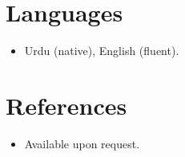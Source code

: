 \documentclass[11pt,a4paper,sans]{moderncv}
\begin{document}

\section{Languages}
\vspace{1pt}
\begin{itemize}
\item {Urdu (native), English (fluent).}
\end{itemize}


\section{References}
\vspace{1pt}
\begin{itemize}
\item{Available upon request.}
\end{itemize}
\end{document}
